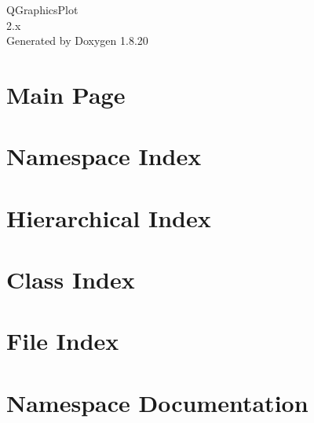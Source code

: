 \let\mypdfximage\pdfximage\def\pdfximage{\immediate\mypdfximage}\documentclass[twoside]{book}
\newcommand{\+}{\discretionary{\mbox{\scriptsize$\hookleftarrow$}}{}{}}
\newcommand{\clearemptydoublepage}{%
  \newpage{\pagestyle{empty}\cleardoublepage}%
}
\begin{document}
\begin{titlepage}
\vspace*{7cm}
\begin{center}%
{\Large Q\+Graphics\+Plot \\[1ex]\large 2.\+x }\\
\vspace*{1cm}
{\large Generated by Doxygen 1.8.20}\\
\end{center}
\end{titlepage}
\clearemptydoublepage
{}
\tableofcontents
\clearemptydoublepage
{}

\chapter{Main Page}
\label{index}
\chapter{Namespace Index}

\chapter{Hierarchical Index}

\chapter{Class Index}

\chapter{File Index}

\chapter{Namespace Documentation}


\end{document}
